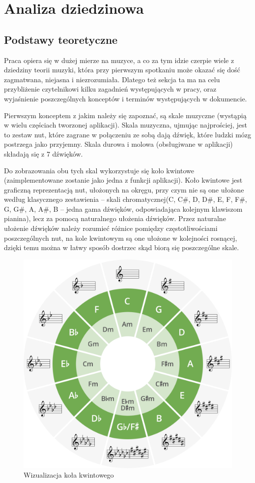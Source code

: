 \chapter{Analiza dziedzinowa}
\section{Podstawy teoretyczne}
Praca opiera się w dużej mierze na muzyce, a co za tym idzie czerpie wiele z dziedziny teorii muzyki, która przy pierwszym spotkaniu może okazać się dość zagmatwana, niejasna i niezrozumiała. Dlatego też sekcja ta ma na celu przybliżenie czytelnikowi kilku zagadnień występujących w pracy, oraz wyjaśnienie poszczególnych konceptów i terminów występujących w dokumencie. 

Pierwszym konceptem z jakim należy się zapoznać, są skale muzyczne (wystąpią w wielu częściach tworzonej aplikacji). Skala muzyczna, ujmując najprościej, jest to zestaw nut, które zagrane w połączeniu ze sobą dają dźwięk, które ludzki mózg postrzega jako przyjemny. 
Skala durowa i molowa (obsługiwane w aplikacji) składają się z 7 dźwięków. 

Do zobrazowania obu tych skal wykorzystuje się koło kwintowe (zaimplementowane zostanie jako jedna z funkcji aplikacji). Koło kwintowe jest graficzną reprezentacją nut, ułożonych na okręgu, przy czym nie są one ułożone według klasycznego zestawienia -- skali chromatycznej(C, C\#, D, D\#, E, F, F\#, G, G\#, A, A\#, B -- jedna gama dźwięków, odpowiadająca kolejnym klawiszom pianina), lecz za pomocą naturalnego ułożenia dźwięków. Przez naturalne ułożenie dźwięków należy rozumieć różnice pomiędzy częstotliwościami poszczególnych nut, na kole kwintowym są one ułożone w kolejności rosnącej, dzięki temu można w łatwy sposób dostrzec skąd biorą się poszczególne skale. 


\begin{figure}[htb]
	\centering
	\includegraphics[width=.3\linewidth]{rys02/cof2.1}
	\caption{Wizualizacja koła kwintowego} \label{fig:pageLayout}
\end{figure}

